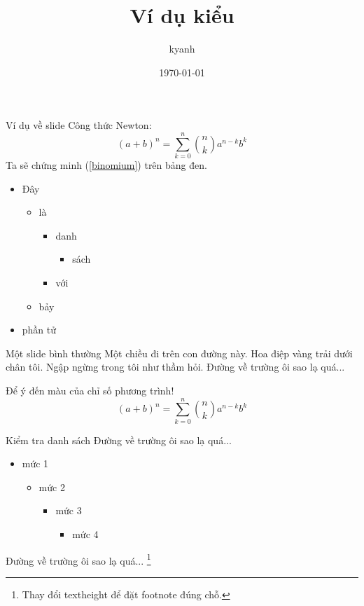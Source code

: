 \documentclass[
	style=\style,
	clock,
	size=11pt,
	paper=screen,
	orient=landscape
]{powerdot}
\title{Ví dụ kiểu \style}
\author{kyanh}
\date{\today}
\begin{document}
\maketitle

\begin{slide}{Ví dụ về slide}
  Công thức Newton:
  \begin{equation}\label{binomium}
    (a+b)^n=\sum_{k=0}^n{n\choose k}a^{n-k}b^k
  \end{equation}
  Ta sẽ chứng minh (\ref{binomium}) trên bảng đen.\\
  \begin{itemize}
    \item Đây
    \begin{itemize}
      \item là
      \begin{itemize}
        \item danh
        \begin{itemize}
          \item sách
        \end{itemize}
        \item với
      \end{itemize}
      \item bảy
    \end{itemize}
    \item phần tử
  \end{itemize}
\end{slide}


\begin{slide}{Một slide bình thường}
  Một chiều đi trên con đường này. Hoa điệp vàng trải dưới chân tôi.
  Ngập ngừng trong tôi như thầm hỏi. Đường về trường ôi sao lạ quá...

  Để ý đến màu của chỉ số phương trình!
  \begin{equation}
    (a+b)^n=\sum_{k=0}^n{n\choose k}a^{n-k}b^k
  \end{equation}
\end{slide}

\begin{slide}{Kiểm tra danh sách}
  Đường về trường ôi sao lạ quá...
  \pause
  \begin{itemize}
    \item mức 1\pause
    \begin{itemize}
      \item mức 2\pause
      \begin{itemize}
        \item mức 3\pause
        \begin{itemize}
          \item mức 4
        \end{itemize}
      \end{itemize}
    \end{itemize}
  \end{itemize}
  Đường về trường ôi sao lạ quá...
  \footnote{Thay đổi textheight để đặt footnote đúng chỗ.}
\end{slide}
\end{document}

